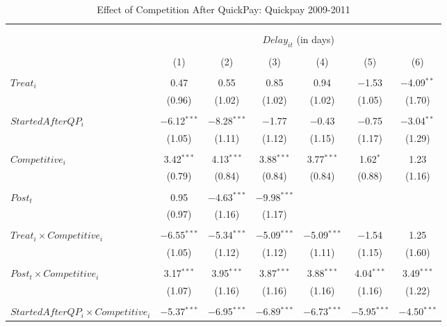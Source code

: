 \documentclass[]{article}
\begin{document}
\begin{table}[H] \centering 
  \caption{Effect of Competition After QuickPay: Quickpay 2009-2011} 
  \label{} 
\small 
\begin{tabular}{@{\extracolsep{-3pt}}lcccccc} 
\\[-1.8ex]\hline 
\hline \\[-1.8ex] 
\\[-1.8ex] & \multicolumn{6}{c}{$Delay_{it}$ (in days)} \\ 
\\[-1.8ex] & (1) & (2) & (3) & (4) & (5) & (6)\\ 
\hline \\[-1.8ex] 
 $Treat_i$ & 0.47 & 0.55 & 0.85 & 0.94 & $-$1.53 & $-$4.09$^{**}$ \\ 
  & (0.96) & (1.02) & (1.02) & (1.02) & (1.05) & (1.70) \\ 
  & & & & & & \\ 
 $StartedAfterQP_i$ & $-$6.12$^{***}$ & $-$8.28$^{***}$ & $-$1.77 & $-$0.43 & $-$0.75 & $-$3.04$^{**}$ \\ 
  & (1.05) & (1.11) & (1.12) & (1.15) & (1.17) & (1.29) \\ 
  & & & & & & \\ 
 $Competitive_i$ & 3.42$^{***}$ & 4.13$^{***}$ & 3.88$^{***}$ & 3.77$^{***}$ & 1.62$^{*}$ & 1.23 \\ 
  & (0.79) & (0.84) & (0.84) & (0.84) & (0.88) & (1.16) \\ 
  & & & & & & \\ 
 $Post_t$ & 0.95 & $-$4.63$^{***}$ & $-$9.98$^{***}$ &  &  &  \\ 
  & (0.97) & (1.16) & (1.17) &  &  &  \\ 
  & & & & & & \\ 
 $Treat_i \times Competitive_i$ & $-$6.55$^{***}$ & $-$5.34$^{***}$ & $-$5.09$^{***}$ & $-$5.09$^{***}$ & $-$1.54 & 1.25 \\ 
  & (1.05) & (1.12) & (1.12) & (1.11) & (1.15) & (1.60) \\ 
  & & & & & & \\ 
 $Post_t \times Competitive_i$ & 3.17$^{***}$ & 3.95$^{***}$ & 3.87$^{***}$ & 3.88$^{***}$ & 4.04$^{***}$ & 3.49$^{***}$ \\ 
  & (1.07) & (1.16) & (1.16) & (1.16) & (1.16) & (1.22) \\ 
  & & & & & & \\ 
 $StartedAfterQP_i \times Competitive_i$ & $-$5.37$^{***}$ & $-$6.95$^{***}$ & $-$6.89$^{***}$ & $-$6.73$^{***}$ & $-$5.95$^{***}$ & $-$4.50$^{***}$ \\ 

\end{tabular}
\end{table}
\end{document}
